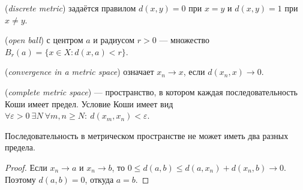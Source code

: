 \begin{definition}
 (\emph{discrete metric}) задаётся правилом \(d(x,y)=0\) при \(x=y\) и \(d(x,y)=1\) при \(x\ne y\).
\end{definition}
\begin{definition}
 (\emph{open ball}) с центром \(a\) и радиусом \(r>0\) — множество \(B_r(a)=\{x\in X:d(x,a)<r\}\).
\end{definition}
\begin{definition}
 (\emph{convergence in a metric space}) означает \(x_n\to x\), если \(d(x_n,x)\to0\).
\end{definition}
\begin{definition}
 (\emph{complete metric space}) — пространство, в котором каждая последовательность Коши имеет предел. Условие Коши имеет вид \(\forall\varepsilon>0\ \exists N\ \forall m,n\ge N:\ d(x_m,x_n)<\varepsilon\).
\end{definition}
\begin{theorem}\label{thm:legacy-c28-3}
Последовательность в метрическом пространстве не может иметь два разных предела.
\end{theorem}
\begin{proof}
Если \(x_n\to a\) и \(x_n\to b\), то \(0\le d(a,b)\le d(a,x_n)+d(x_n,b)\to0\). Поэтому \(d(a,b)=0\), откуда \(a=b\).
\end{proof}
